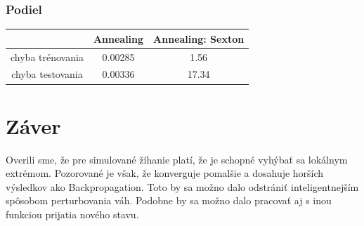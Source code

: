\documentclass[11pt,a4paper]{article}
\begin{document}
\subsubsection{Podiel}
\begin{center}
\begin{tabular}{|c|c|c|}
\hline 
 & Annealing & Annealing: Sexton\\ 
\hline 
chyba trénovania  & 0.00285  & 1.56\\ 
\hline 
chyba testovania  & 0.00336 & 17.34\\ 
\hline 
\end{tabular}
\end{center}

\section{Záver}
Overili sme, že pre simulované žíhanie platí, že je schopné vyhýbať sa lokálnym extrémom. Pozorované je však, že konverguje pomalšie a dosahuje horších výsledkov ako Backpropagation. Toto by sa možno dalo odstrániť inteligentnejším spôsobom perturbovania váh. Podobne by sa možno dalo pracovať aj s inou funkciou prijatia nového stavu.



\end{document}

